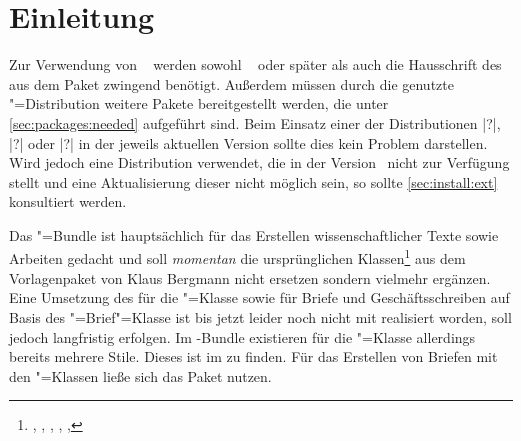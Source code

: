 \chapter{Einleitung}
%
Zur Verwendung von \TUDScript~\vTUDScript{} werden sowohl 
\KOMAScript~\vKOMAScript{} oder später als auch die Hausschrift des 
\CDs \OpenSans aus dem Paket  zwingend benötigt. Außerdem 
müssen durch die genutzte "=Distribution weitere Pakete 
bereitgestellt werden, die unter \autoref{sec:packages:needed} aufgeführt sind. 
Beim Einsatz einer der Distributionen 
|?|, 
|?| oder 
|?| 
in der jeweils aktuellen Version sollte dies kein Problem darstellen. Wird 
jedoch eine Distribution verwendet, die \TUDScript in der Version~\vTUDScript{} 
nicht zur Verfügung stellt und eine Aktualisierung dieser nicht möglich sein, 
so sollte \autoref{sec:install:ext} konsultiert werden.

Das \TUDScript"=Bundle ist hauptsächlich für das Erstellen wissenschaftlicher 
Texte sowie Arbeiten gedacht und soll \emph{momentan} die ursprünglichen 
Klassen\footnote{%
  , , , , 
  , %
} aus dem Vorlagenpaket von Klaus Bergmann nicht ersetzen sondern vielmehr 
ergänzen. 
%
Eine Umsetzung des \CDs für die "=Klasse sowie für Briefe und 
Geschäftsschreiben auf Basis des \KOMAScript"=Brief"=Klasse  
ist bis jetzt leider noch nicht mit \TUDScript realisiert worden, soll jedoch 
langfristig erfolgen. Im -Bundle existieren für die 
"=Klasse allerdings bereits mehrere Stile. Dieses ist im 
 zu finden. Für das Erstellen von Briefen mit den \TUDScript"=Klassen ließe 
sich das Paket  nutzen.



